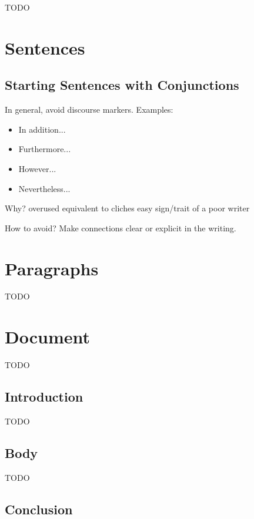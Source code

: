 \documentclass[10pt,a4paper]{book}
\begin{document}
\color{BrickRed}TODO\color{black}


\chapter{Sentences}

\section{Starting Sentences with Conjunctions}

In general, avoid discourse markers. Examples:
\begin{itemize}
    \itemsep1pt\parskip0pt
    \item In addition...
    \item Furthermore...
    \item However...
    \item Nevertheless...
\end{itemize}

Why?
overused
equivalent to cliches
easy sign/trait of a poor writer

How to avoid?
Make connections clear or explicit in the writing.


\chapter{Paragraphs}

\color{BrickRed}TODO\color{black}


\chapter{Document}

\color{BrickRed}TODO\color{black}


\section{Introduction}

\color{BrickRed}TODO\color{black}


\section{Body}

\color{BrickRed}TODO\color{black}


\section{Conclusion}
\end{document}
